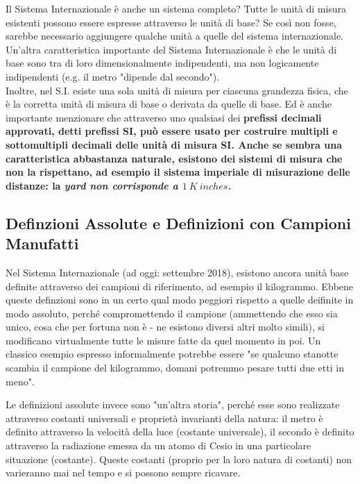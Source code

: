 \documentclass[a4paper,11pt]{report}
\begin{document}
Il Sistema Internazionale è anche un sistema completo? Tutte le unità di misura esistenti possono essere espresse attraverso le unità di base? Se così non fosse, sarebbe necessario aggiungere qualche unità a quelle del sistema internazionale.\\

Un'altra caratteristica importante del Sistema Internazionale è che le unità di base sono tra di loro dimensionalmente indipendenti, ma non logicamente indipendenti (e.g. il metro "dipende dal secondo").\\

Inoltre, nel S.I. esiste una sola unità di misura per ciascuna grandezza fisica, che è la corretta unità di misura di base o derivata da quelle di base. Ed è anche importante menzionare che attraverso uno qualsiasi dei \bf prefissi decimali approvati\rm, detti prefissi SI, può essere usato per costruire multipli e sottomultipli decimali delle unità di misura SI. Anche se sembra una caratteristica abbastanza naturale, esistono dei sistemi di misura che non la rispettano, ad esempio il sistema imperiale di misurazione delle distanze: la \it yard \rm non corrisponde a $1\ K\ inches$.

\subsection{Definzioni Assolute e Definizioni con Campioni Manufatti}
Nel Sistema Internazionale (ad oggi: settembre 2018), esistono ancora unità base definite attraverso dei campioni di riferimento, ad esempio il kilogrammo. Ebbene queste definzioni sono in un certo qual modo peggiori rispetto a quelle deifinite in modo assoluto, perché compromettendo il campione (ammettendo che esso sia unico, cosa che per fortuna non è - ne esistono diversi altri molto simili), si modificano virtualmente tutte le misure fatte da quel momento in poi. Un classico esempio espresso informalmente potrebbe essere "se qualcuno stanotte scambia il campione del kilogrammo, domani potremmo pesare tutti due etti in meno".

Le definizioni assolute invece sono "un'altra storia", perché esse sono realizzate attraverso costanti universali e proprietà invarianti della natura: il metro è definito attraverso la velocità della luce (costante universale), il secondo è definito attraverso la radiazione emessa da un atomo di Cesio in una particolare situazione (costante). Queste costanti (proprio per la loro natura di costanti) non varieranno mai nel tempo e si possono sempre ricavare.
\end{document}
